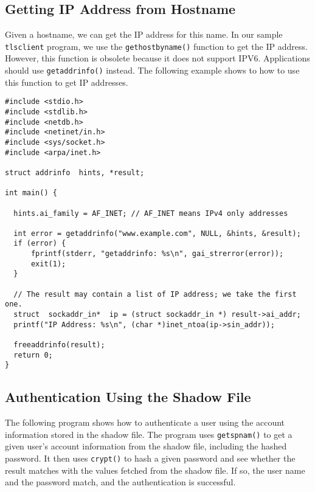 \subsection{Getting IP Address from Hostname}
\label{vpn:subsec:hostnametoip}


Given a hostname, we can get the IP address for this name. 
In our sample \texttt{tlsclient} program, we use
the \texttt{gethostbyname()} function to get the IP address. However, this
function is obsolete because it does not support IPV6. 
Applications should use \texttt{getaddrinfo()} instead. The following 
example shows to how to use this function to get IP addresses. 


\begin{lstlisting}
#include <stdio.h>
#include <stdlib.h>
#include <netdb.h>
#include <netinet/in.h>
#include <sys/socket.h>
#include <arpa/inet.h>

struct addrinfo  hints, *result;

int main() {

  hints.ai_family = AF_INET; // AF_INET means IPv4 only addresses

  int error = getaddrinfo("www.example.com", NULL, &hints, &result);
  if (error) {
      fprintf(stderr, "getaddrinfo: %s\n", gai_strerror(error));
      exit(1);
  }

  // The result may contain a list of IP address; we take the first one.
  struct  sockaddr_in*  ip = (struct sockaddr_in *) result->ai_addr;
  printf("IP Address: %s\n", (char *)inet_ntoa(ip->sin_addr));

  freeaddrinfo(result);
  return 0;
}
\end{lstlisting}
 


\subsection{Authentication Using the Shadow File}
\label{vpn:subsec:auth}


The following program shows how to authenticate a user using 
the account information stored in the shadow file.
The program uses \texttt{getspnam()} to get 
a given user's account information from the shadow file, including the 
hashed password. It then uses \texttt{crypt()} to 
hash a given password and see whether the result matches with
the values fetched from the shadow file. If so, the user name and the password match, 
and the authentication is successful. 


